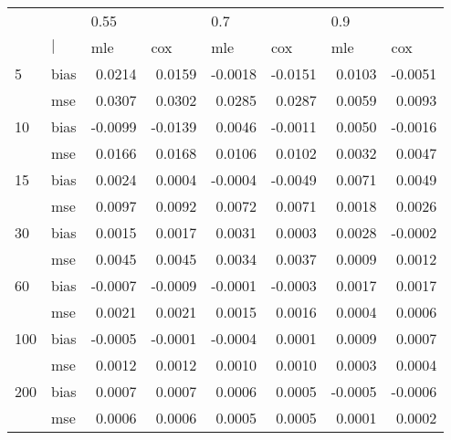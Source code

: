 \begin{table}[ht]
\centering
\begin{tabular}{ll rrrrrr}
  \toprule
     &            & \multicolumn{1}{l}{    0.55} & \multicolumn{1}{l}{        } & \multicolumn{1}{l}{     0.7} & \multicolumn{1}{l}{        } & \multicolumn{1}{l}{     0.9} & \multicolumn{1}{l}{        } \\ 
      &  $\vert$  & \multicolumn{1}{l}{     mle} & \multicolumn{1}{l}{     cox} & \multicolumn{1}{l}{     mle} & \multicolumn{1}{l}{     cox} & \multicolumn{1}{l}{     mle} & \multicolumn{1}{l}{     cox} \\ 
   \midrule
5   & bias       &  0.0214 &  0.0159 & -0.0018 & -0.0151 &  0.0103 & -0.0051 \\ 
      & mse        &  0.0307 &  0.0302 &  0.0285 &  0.0287 &  0.0059 &  0.0093 \\ 
  10  & bias       & -0.0099 & -0.0139 &  0.0046 & -0.0011 &  0.0050 & -0.0016 \\ 
      & mse        &  0.0166 &  0.0168 &  0.0106 &  0.0102 &  0.0032 &  0.0047 \\ 
  15  & bias       &  0.0024 &  0.0004 & -0.0004 & -0.0049 &  0.0071 &  0.0049 \\ 
      & mse        &  0.0097 &  0.0092 &  0.0072 &  0.0071 &  0.0018 &  0.0026 \\ 
  30  & bias       &  0.0015 &  0.0017 &  0.0031 &  0.0003 &  0.0028 & -0.0002 \\ 
      & mse        &  0.0045 &  0.0045 &  0.0034 &  0.0037 &  0.0009 &  0.0012 \\ 
  60  & bias       & -0.0007 & -0.0009 & -0.0001 & -0.0003 &  0.0017 &  0.0017 \\ 
      & mse        &  0.0021 &  0.0021 &  0.0015 &  0.0016 &  0.0004 &  0.0006 \\ 
  100 & bias       & -0.0005 & -0.0001 & -0.0004 &  0.0001 &  0.0009 &  0.0007 \\ 
      & mse        &  0.0012 &  0.0012 &  0.0010 &  0.0010 &  0.0003 &  0.0004 \\ 
  200 & bias       &  0.0007 &  0.0007 &  0.0006 &  0.0005 & -0.0005 & -0.0006 \\ 
      & mse        &  0.0006 &  0.0006 &  0.0005 &  0.0005 &  0.0001 &  0.0002 \\ 
   \bottomrule
\end{tabular}
\end{table}
